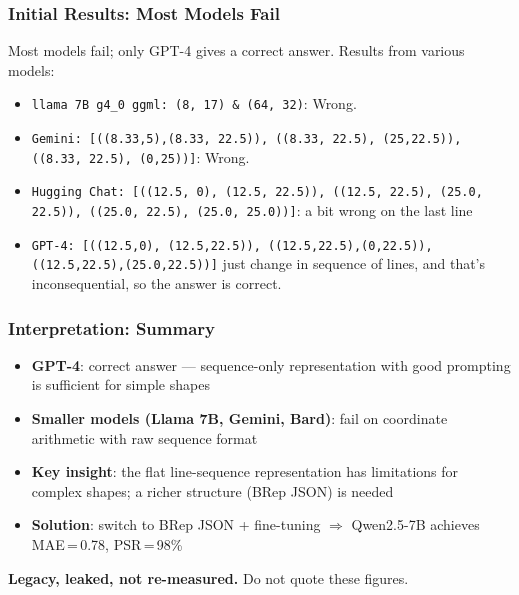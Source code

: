 \begin{frame}[fragile]\frametitle{Initial Results: Most Models Fail}

Most models fail; only GPT-4 gives a correct answer. Results from various models:
\begin{itemize}
\item \lstinline|llama 7B g4_0 ggml: (8, 17) & (64, 32)|: Wrong.
\item \lstinline|Gemini: [((8.33,5),(8.33, 22.5)), ((8.33, 22.5), (25,22.5)), ((8.33, 22.5), (0,25))]|: Wrong.
\item \lstinline|Hugging Chat: [((12.5, 0), (12.5, 22.5)), ((12.5, 22.5), (25.0, 22.5)), ((25.0, 22.5), (25.0, 25.0))]|: a bit wrong on the last line
\item \lstinline|GPT-4: [((12.5,0), (12.5,22.5)), ((12.5,22.5),(0,22.5)), ((12.5,22.5),(25.0,22.5))]| just change in sequence of lines, and that's inconsequential, so the answer is correct.
\end{itemize}	
\end{frame}

\begin{frame}[fragile]\frametitle{Interpretation: Summary}

\begin{itemize}
\item \textbf{GPT-4}: correct answer — sequence-only representation with good prompting is sufficient for simple shapes
\item \textbf{Smaller models (Llama 7B, Gemini, Bard)}: fail on coordinate arithmetic with raw sequence format
\item \textbf{Key insight}: the flat line-sequence representation has limitations for complex shapes; a richer structure (BRep JSON) is needed
\item \textbf{Solution}: switch to BRep JSON + fine-tuning $\Rightarrow$ Qwen2.5-7B achieves MAE\,=\,0.78, PSR\,=\,98\%
\end{itemize}

\vspace{2pt}
{\footnotesize \textbf{Legacy, leaked, not re-measured.} Do not quote these figures.}
\end{frame}

